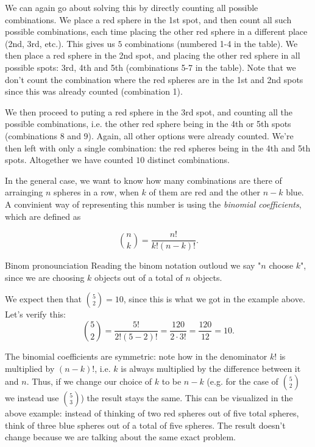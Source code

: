 We can again go about solving this by directly counting all possible combinations. We place a red sphere in the 1st spot, and then count all such possible combinations, each time placing the other red sphere in a different place (2nd, 3rd, etc.). This gives us $5$ combinations (numbered 1-4 in the table). We then place a red sphere in the 2nd spot, and placing the other red sphere in all possible spots: 3rd, 4th and 5th (combinations 5-7 in the table). Note that we don't count the combination where the red spheres are in the 1st and 2nd spots since this was already counted (combination 1).

We then proceed to puting a red sphere in the 3rd spot, and counting all the possible combinations, i.e. the other red sphere being in the 4th or 5th spots (combinations 8 and 9). Again, all other options were already counted. We're then left with only a single combination: the red spheres being in the 4th and 5th spots. Altogether we have counted $10$ distinct combinations.

In the general case, we want to know how many combinations are there of arrainging $n$ spheres in a row, when $k$ of them are red and the other $n-k$ blue. A convinient way of representing this number is using the \emph{binomial coefficients}, which are defined as

\begin{equation}
	\binom{n}{k} = \frac{n!}{k!(n-k)!}.
	\label{eq:binom_def}
\end{equation}

\begin{note}{Binom pronounciation}{}
	Reading the binom notation outloud we say "$n$ choose $k$", since we are choosing $k$ objects out of a total of $n$ objects.
\end{note}

We expect then that $\binom{5}{2}=10$, since this is what we got in the example above. Let's verify this:
\[
	\binom{5}{2} = \frac{5!}{2!(5-2)!} = \frac{120}{2\cdot3!} = \frac{120}{12} = 10.
\]

The binomial coefficients are symmetric: note how in the denominator $k!$ is multiplied by $(n-k)!$, i.e. $k$ is always multiplied by the difference between it and $n$. Thus, if we change our choice of $k$ to be $n-k$ (e.g. for the case of $\binom{5}{2}$ we instead use $\binom{5}{3}$) the result stays the same. This can be visualized in the above example: instead of thinking of two red spheres out of five total spheres, think of three blue spheres out of a total of five spheres. The result doesn't change because we are talking about the same exact problem.

